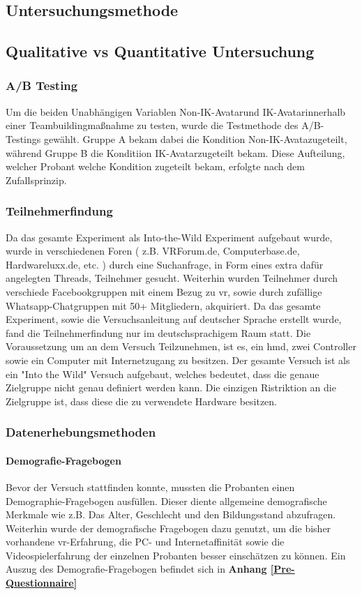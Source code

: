 \documentclass[a4paper,11pt]{article}%
\renewcommand{\\}{\vspace*{0.5\baselineskip} \newline}
\begin{document}
		\subsection{Untersuchungsmethode}
			\subsection{Qualitative vs Quantitative Untersuchung}
			
			\subsubsection{A/B Testing}
Um die beiden Unabhängigen Variablen \flqq Non-IK-Avatar\frqq und \flqq IK-Avatar\frqq innerhalb einer Teambuildingmaßnahme zu testen, wurde die Testmethode des A/B-Testings gewählt.
Gruppe A bekam dabei die Kondition \flqq Non-IK-Avata\frqq zugeteilt, während Gruppe B die Konditiion \flqq IK-Avatar\frqq zugeteilt bekam. Diese Aufteilung, welcher Probant welche Kondition zugeteilt bekam, erfolgte nach dem Zufallsprinzip. 

			\subsubsection{Teilnehmerfindung}
Da das gesamte Experiment als Into-the-Wild Experiment aufgebaut wurde, wurde in verschiedenen Foren ( z.B. VRForum.de, Computerbase.de, Hardwareluxx.de, etc. ) durch eine Suchanfrage, in Form eines extra dafür angelegten Threads, Teilnehmer gesucht. Weiterhin wurden Teilnehmer durch verschiede Facebookgruppen mit einem Bezug zu \ac{vr}, sowie durch zufällige Whatsapp-Chatgruppen mit 50+ Mitgliedern, akquiriert. Da das gesamte Experiment, sowie die Versuchsanleitung auf deutscher Sprache erstellt wurde, fand die Teilnehmerfindung nur im deutschsprachigem Raum statt.
Die Voraussetzung um an dem Versuch Teilzunehmen, ist es, ein \ac{hmd}, zwei Controller sowie ein Computer mit Internetzugang zu besitzen. Der gesamte Versuch ist als ein "Into the Wild" Versuch aufgebaut, welches bedeutet, dass die genaue Zielgruppe nicht genau definiert werden kann. Die einzigen Ristriktion an die Zielgruppe ist, dass diese die zu verwendete Hardware besitzen.\\

		\subsubsection{Datenerhebungsmethoden}
			
			\paragraph{Demografie-Fragebogen}
Bevor der Versuch stattfinden konnte, mussten die Probanten einen Demographie-Fragebogen ausfüllen. Dieser diente allgemeine demografische Merkmale wie z.B. Das Alter, Geschlecht und den Bildungsstand abzufragen. Weiterhin wurde der demografische Fragebogen dazu genutzt, um die bisher vorhandene \ac{vr}-Erfahrung, die PC- und Internetaffinität sowie die Videospielerfahrung der einzelnen Probanten besser einschätzen zu können.
\\Ein Auszug des Demografie-Fragebogen befindet sich in \textbf{Anhang \ref{Pre-Questionnaire}}
\end{document}
